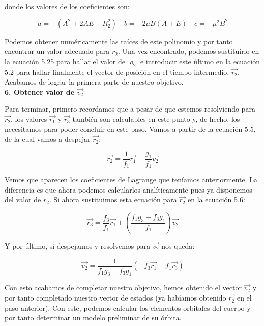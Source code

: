 \documentclass{article}
\numberwithin{equation}{section}
\begin{document}
donde los valores de los coeficientes son:

\begin{equation*}
    a = -(A^2 + 2AE + R_2^2) \quad b = -2\mu B(A + E) \quad c = -\mu^2 B^2
\end{equation*}

Podemos obtener numéricamente las raíces de este polinomio y por tanto encontrar un valor adecuado para $r_2$. Una vez encontrado, podemos sustituirlo en la ecuación 5.25 para hallar el valor de $\varrho_2$ e introducir este último en la ecuación 5.2 para hallar finalmente el vector de posición en el tiempo intermedio, $\overrightarrow{r_2}$. Acabamos de lograr la primera parte de nuestro objetivo.\\

\noindent\textbf{6. Obtener valor de $\overrightarrow{v_2}$}

Para terminar, primero recordamos que a pesar de que estemos resolviendo para $\overrightarrow{r_2}$, los valores $\overrightarrow{r_1}$ y $\overrightarrow{r_3}$ también son calculables en este punto y, de hecho, los necesitamos para poder concluir en este paso. Vamos a partir de la ecuación 5.5, de la cual vamos a despejar $\overrightarrow{r_2}$:

\begin{equation}
    \overrightarrow{r_2} = \frac{1}{f_1} \overrightarrow{r_1} - \frac{g_1}{f_1} \overrightarrow{v_2} 
\end{equation}

Vemos que aparecen los coeficientes de Lagrange que teníamos anteriormente. La diferencia es que ahora podemos calcularlos analíticamente pues ya disponemos del valor de $r_2$. Si ahora sustituimos esta ecuación para $\overrightarrow{r_2}$ en la ecuación 5.6:

\begin{equation}
    \overrightarrow{r_3} = \frac{f_3}{f_1} \overrightarrow{r_1} + \left( \frac{f_1 g_3 - f_3 g_1}{f_1} \right) \overrightarrow{v_2}
\end{equation}

Y por último, si despejamos y resolvemos para $\overrightarrow{v_2}$ nos queda:

\begin{equation}
    \overrightarrow{v_2} = \frac{1}{f_1 g_3 - f_3 g_1} (-f_3 \overrightarrow{r_1} + f_1 \overrightarrow{r_3})
\end{equation}

Con esto acabamos de completar nuestro objetivo, hemos obtenido el vector $\overrightarrow{v_2}$ y por tanto completado nuestro vector de estados (ya habíamos obtenido $\overrightarrow{r_2}$ en el paso anterior). Con este, podemos calcular los elementos orbitales del cuerpo y por tanto determinar un modelo preliminar de su órbita.\\
\end{document}
